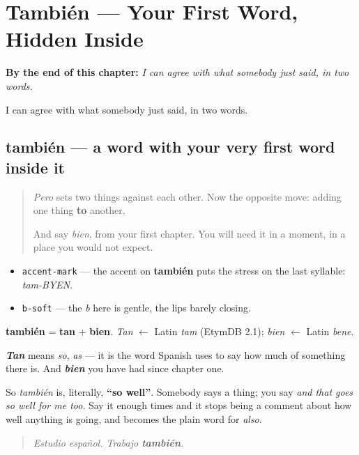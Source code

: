 
\chapter{También --- Your First Word, Hidden Inside}
\label{ch:tambien}

\begin{chapteropening}
\textbf{By the end of this chapter:} \emph{I can agree with what somebody just said, in two words.}

I can agree with what somebody just said, in two words.
\end{chapteropening}

\section[también]{también — a word with your very first word inside it}

\label{lesson:ES-C58-tambien}



\begin{quote}
\emph{Pero} sets two things against each other. Now the opposite move: adding one thing \textbf{to} another.

And say \emph{bien}, from your first chapter. You will need it in a moment, in a place you would not expect.
\end{quote}

\begin{sounds}
\begin{itemize}
\raggedright
  \item \texttt{accent-mark} — the accent on \textbf{también} puts the stress on the last syllable: \emph{tam-BYEN}.
  \item \texttt{b-soft} — the \emph{b} here is gentle, the lips barely closing.
\end{itemize}
\end{sounds}

\begin{cousinweb}
\textbf{también} = \textbf{tan} + \textbf{bien}. \emph{Tan} $\leftarrow$ Latin \emph{tam} (EtymDB 2.1); \emph{bien} $\leftarrow$ Latin \emph{bene}.

\emph{\textbf{Tan}} means \emph{so}, \emph{as} — it is the word Spanish uses to say how much of something there is. And \emph{\textbf{bien}} you have had since chapter one.

So \emph{también} is, literally, \textbf{\textquotedblleft{}so well\textquotedblright{}}. Somebody says a thing; you say \emph{and that goes so well for me too}. Say it enough times and it stops being a comment about how well anything is going, and becomes the plain word for \emph{also}.

\begin{quote}
\emph{Estudio español. Trabajo \textbf{también}.}
\end{quote}
\end{cousinweb}

